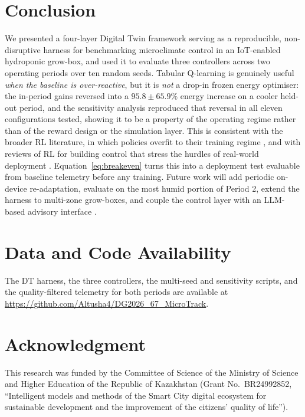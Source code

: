 \documentclass[conference]{IEEEtran}
\begin{document}
\section{Conclusion}
We presented a four-layer Digital Twin framework serving as a reproducible,
non-disruptive harness for benchmarking microclimate control in an IoT-enabled
hydroponic grow-box, and used it to evaluate three controllers across two
operating periods over ten random seeds. Tabular Q-learning is genuinely useful
\emph{when the baseline is over-reactive}, but it is \emph{not} a drop-in frozen
energy optimiser: the in-period gains reversed into a $95.8\pm65.9\%$ energy
increase on a cooler held-out period, and the sensitivity analysis reproduced
that reversal in all eleven configurations tested, showing it to be a property of
the operating regime rather than of the reward design or the simulation layer.
This is consistent with the broader RL literature, in which policies overfit to
their training regime \cite{kirk2023}, and with reviews of RL for building
control that stress the hurdles of real-world deployment \cite{wanghong2020}.
Equation~\eqref{eq:breakeven} turns this into a deployment test evaluable from
baseline telemetry before any training. Future work will add periodic on-device
re-adaptation, evaluate on the most humid portion of Period 2, extend the harness
to multi-zone grow-boxes, and couple the control layer with an LLM-based advisory
interface \cite{bakirov2025}.

\section*{Data and Code Availability}
The DT harness, the three controllers, the multi-seed and sensitivity scripts,
and the quality-filtered telemetry for both periods are available at
\url{https://github.com/Altusha4/DG2026_67_MicroTrack}.

\section*{Acknowledgment}
This research was funded by the Committee of Science of the Ministry of Science
and Higher Education of the Republic of Kazakhstan (Grant No.\ BR24992852,
``Intelligent models and methods of the Smart City digital ecosystem for
sustainable development and the improvement of the citizens' quality of life'').
\end{document}
